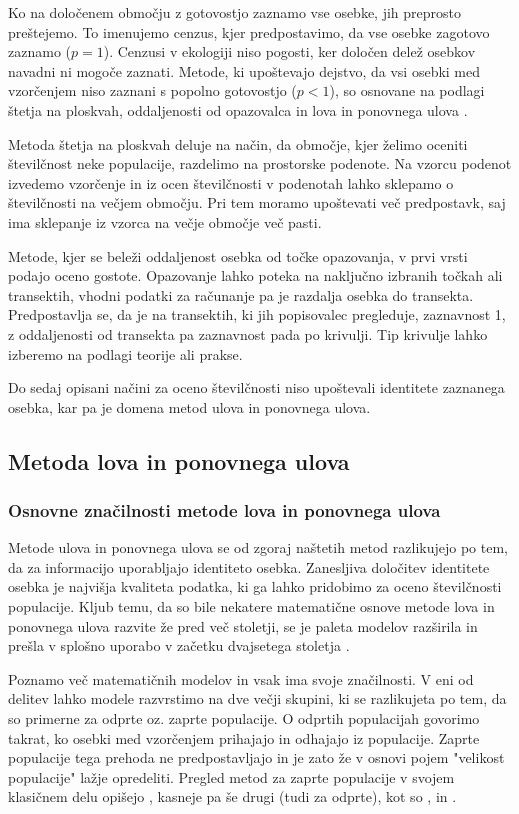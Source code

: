 Ko na določenem območju z gotovostjo zaznamo vse osebke, jih preprosto preštejemo. To imenujemo cenzus, kjer predpostavimo, da vse osebke zagotovo zaznamo ($p=1$). Cenzusi v ekologiji niso pogosti, ker določen delež osebkov navadni ni mogoče zaznati. Metode, ki upoštevajo dejstvo, da vsi osebki med vzorčenjem niso zaznani s popolno gotovostjo ($p < 1$), so osnovane na podlagi štetja na ploskvah, oddaljenosti od opazovalca in lova in ponovnega ulova \citep{williams_analysis_2002}.

Metoda štetja na ploskvah deluje na način, da območje, kjer želimo oceniti številčnost neke populacije, razdelimo na prostorske podenote. Na vzorcu podenot izvedemo vzorčenje in iz ocen številčnosti v podenotah lahko sklepamo o številčnosti na večjem območju. Pri tem moramo upoštevati več predpostavk, saj ima sklepanje iz vzorca na večje območje več pasti.

Metode, kjer se beleži oddaljenost osebka od točke opazovanja, v prvi vrsti podajo oceno gostote. Opazovanje lahko poteka na naključno izbranih točkah ali transektih, vhodni podatki za računanje pa je razdalja osebka do transekta. Predpostavlja se, da je na transektih, ki jih popisovalec pregleduje, zaznavnost 1, z oddaljenosti od transekta pa zaznavnost pada po krivulji. Tip krivulje lahko izberemo na podlagi teorije ali prakse.

Do sedaj opisani načini za oceno številčnosti niso upoštevali identitete zaznanega osebka, kar pa je domena metod ulova in ponovnega ulova.

\subsection{Metoda lova in ponovnega ulova}
\subsubsection{Osnovne značilnosti metode lova in ponovnega ulova}

Metode ulova in ponovnega ulova se od zgoraj naštetih metod razlikujejo po tem, da za informacijo uporabljajo identiteto osebka. Zanesljiva določitev identitete osebka je najvišja kvaliteta podatka, ki ga lahko pridobimo za oceno številčnosti populacije. Kljub temu, da so bile nekatere matematične osnove metode lova in ponovnega ulova razvite že pred več stoletji, se je paleta modelov razširila in prešla v splošno uporabo v začetku dvajsetega stoletja \citep{pollock_capture-recapture_2000}.

Poznamo več matematičnih modelov in vsak ima svoje značilnosti. V eni od delitev lahko modele razvrstimo na dve večji skupini, ki se razlikujeta po tem, da so primerne za odprte oz. zaprte populacije. O odprtih populacijah govorimo takrat, ko osebki med vzorčenjem prihajajo in odhajajo iz populacije. Zaprte populacije tega prehoda ne predpostavljajo in je zato že v osnovi pojem "velikost populacije" lažje opredeliti. Pregled metod za zaprte populacije v svojem klasičnem delu opišejo \citet{otis_statistical_1978}, kasneje pa še drugi (tudi za odprte), kot so \citet{white_capture-recapture_1982}, \citet{seber_review_1986} in \citet{white_program_1999}.

